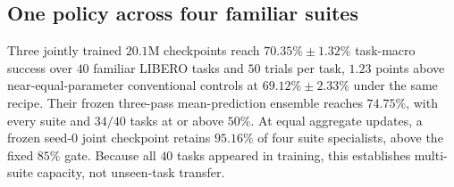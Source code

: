 \subsection{One policy across four familiar suites}
\label{sec:four-suite-breadth}

Three jointly trained $20.1$M checkpoints reach $70.35\%\pm1.32\%$ task-macro
success over $40$ familiar LIBERO tasks and $50$ trials per task, $1.23$ points
above near-equal-parameter conventional controls at $69.12\%\pm2.33\%$ under the
same recipe. Their frozen three-pass mean-prediction ensemble reaches $74.75\%$,
with every suite and $34/40$ tasks at or above $50\%$. At equal aggregate updates,
a frozen seed-$0$ joint checkpoint retains $95.16\%$ of four suite specialists,
above the fixed $85\%$ gate. Because all $40$ tasks appeared in training, this
establishes multi-suite capacity, not unseen-task transfer.
